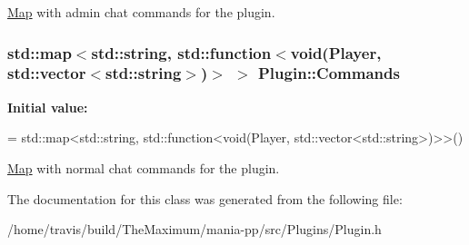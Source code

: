 \hyperlink{structMap}{Map} with admin chat commands for the plugin. 

\hypertarget{classPlugin_a588dcd49b4fe45b3a401b749795b95fe}{
\subsubsection[{Commands}]{\setlength{\rightskip}{0pt plus 5cm}std\-::map$<$std\-::string, std\-::function$<$void({\bf Player}, std\-::vector$<$std\-::string$>$)$>$ $>$ Plugin\-::\-Commands}}\label{classPlugin_a588dcd49b4fe45b3a401b749795b95fe}
{\bfseries Initial value\-:}
\begin{DoxyCode}
=
        std::map<std::string, std::function<void(Player, std::vector<std::string>)>>()
\end{DoxyCode}


\hyperlink{structMap}{Map} with normal chat commands for the plugin. 



The documentation for this class was generated from the following file\-:\begin{DoxyCompactItemize}
\item 
/home/travis/build/\-The\-Maximum/mania-\/pp/src/\-Plugins/Plugin.\-h\end{DoxyCompactItemize}
